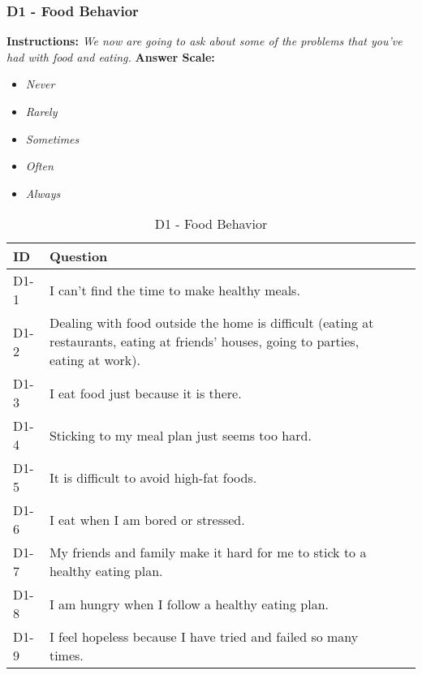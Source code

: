 \subsubsection{D1 - Food Behavior}
\textbf{Instructions:} \emph{We now are going to ask about some of the problems that you've had with food and eating.}
\textbf{Answer Scale:}
\begin{itemize}
    \item \emph{Never}
    \item \emph{Rarely}
    \item \emph{Sometimes}
    \item \emph{Often}
    \item \emph{Always}
\end{itemize}
\begin{table}[H]
    \centering
    \renewcommand{\arraystretch}{1.2}
    \begin{tabularx}{\textwidth}{|l|X|l|}
        \hline
        \textbf{ID} & \textbf{Question} \\ \hline
        D1-1 & I can't find the time to make healthy meals. \\ \hline
        D1-2 & Dealing with food outside the home is difficult (eating at restaurants, eating at friends' houses, going to parties, eating at work). \\ \hline
        D1-3 & I eat food just because it is there. \\ \hline
        D1-4 & Sticking to my meal plan just seems too hard. \\ \hline
        D1-5 & It is difficult to avoid high-fat foods. \\ \hline
        D1-6 & I eat when I am bored or stressed. \\ \hline
        D1-7 & My friends and family make it hard for me to stick to a healthy eating plan. \\ \hline
        D1-8 & I am hungry when I follow a healthy eating plan. \\ \hline
        D1-9 & I feel hopeless because I have tried and failed so many times. \\ \hline
    \end{tabularx}
    \caption{D1 - Food Behavior}
    \label{tab:food-behavior}
\end{table}






